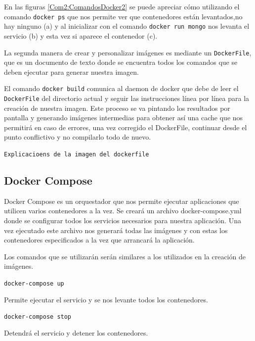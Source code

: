 En las figuras \ref{Com2:ComandosDocker2} se puede apreciar cómo utilizando el comando \texttt{docker ps} que nos permite ver que contenedores están levantados,no hay ninguno (a) y al inicializar con el comando \texttt{docker run mongo} nos levanta el servicio (b) y esta vez si aparece el contenedor (c).
\newline

La segunda manera de crear y personalizar imágenes es mediante un \texttt{DockerFile}, que es un documento de texto donde se encuentra todos los comandos que se deben ejecutar para generar nuestra imagen.

El comando \texttt{docker build} comunica al daemon de docker que debe de leer el \texttt{DockerFile} del directorio actual y seguir las instrucciones línea por línea para la creación de nuestra imagen. Este proceso se va pintando los resultados por pantalla y generando imágenes intermedias para obtener así una cache que nos permitirá en caso de errores, una vez corregido el DockerFile, continuar desde el punto conflictivo y no compilarlo todo de nuevo. 

\begin{center}
\texttt{Explicacioens de la imagen del dockerfile}
\end{center}

\subsection{Docker Compose}

Docker Compose es un orquestador que nos permite ejecutar aplicaciones que utilicen varios contenedores a la vez.
Se creará un archivo docker-compose.yml donde se configurar todos los servicios necesarios para nuestra aplicación. Una vez ejecutado este archivo nos generará todas las imágenes y con estas los contenedores especificados a la vez que arrancará la aplicación.
\pagebreak

Los comandos que se utilizarán serán similares a los utilizados en la creación de imágenes.

\begin{center}
\texttt{docker-compose up}
\end{center} 

Permite ejecutar el servicio y se nos levante todos los contenedores.

\begin{center}
\texttt{docker-compose stop}
\end{center} 

Detendrá el servicio y detener los contenedores. 
\newline

